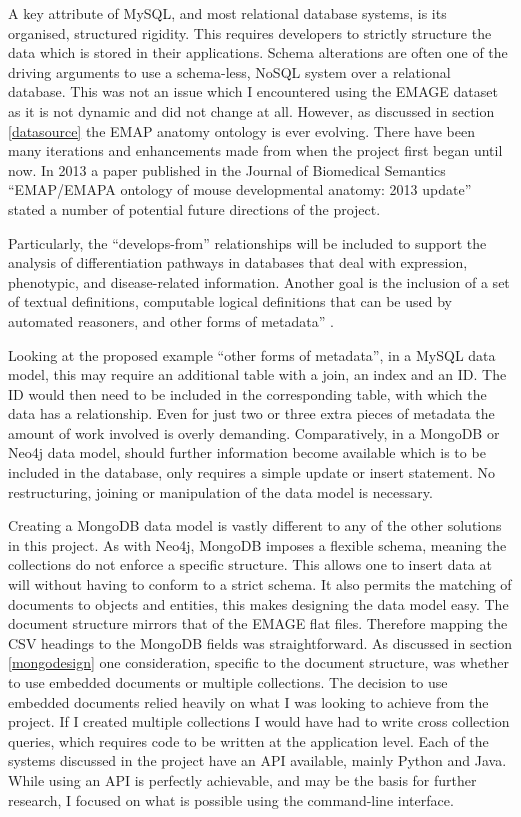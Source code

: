 A key attribute of MySQL, and most relational database systems, is its organised, structured rigidity. This requires developers to strictly structure the data which is stored in their applications. Schema alterations are often one of the driving arguments to use a schema-less, NoSQL system over a relational database. This was not an issue which I encountered using the EMAGE dataset as it is not dynamic and did not change at all. However, as discussed in section \ref{datasource} the EMAP anatomy ontology is ever evolving. There have been many iterations and enhancements made from when the project first began until now. In 2013 a paper published in the Journal of Biomedical Semantics ``EMAP/EMAPA ontology of mouse developmental anatomy: 2013 update'' stated a number of potential future directions of the project.

Particularly, the ``develops-from'' relationships will be included to support the analysis of differentiation pathways in databases that deal with expression, phenotypic, and disease-related information. Another goal is the inclusion of a set of textual definitions, computable logical definitions that can be used by automated reasoners, and other forms of metadata'' \cite{biomed}.

Looking at the proposed example ``other forms of metadata'', in a MySQL data model, this may require an additional table with a join, an index and an ID. The ID would then need to be included in the corresponding table, with which the data has a relationship. Even for just two or three extra pieces of metadata the amount of work involved is overly demanding. Comparatively, in a MongoDB or Neo4j data model, should further information become available which is to be included in the database, only requires a simple update or insert statement. No restructuring, joining or manipulation of the data model is necessary.

Creating a MongoDB data model is vastly different to any of the other solutions in this project. As with Neo4j, MongoDB imposes a flexible schema, meaning the collections do not enforce a specific structure. This allows one to insert data at will without having to conform to a strict schema. It also permits the matching of documents to objects and entities, this makes designing the data model easy. The document structure mirrors that of the EMAGE flat files. Therefore mapping the CSV headings to the MongoDB fields was straightforward. As discussed in section \ref{mongodesign} one consideration, specific to the document structure, was whether to use embedded documents or multiple collections. The decision to use embedded documents relied heavily on what I was looking to achieve from the project. If I created multiple collections I would have had to write cross collection queries, which requires code to be written at the application level. Each of the systems discussed in the project have an API available, mainly Python and Java. While using an API is perfectly achievable, and may be the basis for further research, I focused on what is possible using the command-line interface. 

